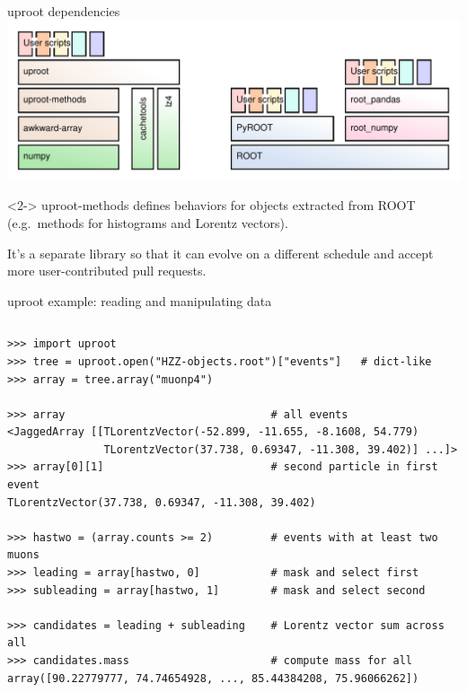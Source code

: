 \documentclass[aspectratio=169]{beamer}
\begin{document}
\begin{frame}{uproot dependencies}
\vspace{0.5 cm}
\includegraphics[width=\linewidth]{abstraction-layers.pdf}

\begin{uncoverenv}<2->
\vspace{0.1 cm}
uproot-methods defines behaviors for objects extracted from ROOT (e.g.\ methods for histograms and Lorentz vectors).

\vspace{0.2 cm}
It's a separate library so that it can evolve on a different schedule and accept more user-contributed pull requests.
\end{uncoverenv}
\end{frame}

\begin{frame}[fragile]{uproot example: reading and manipulating data}
\small
\vspace{0.1 cm}
\begin{columns}
\begin{verbatim}
>>> import uproot
>>> tree = uproot.open("HZZ-objects.root")["events"]   # dict-like
>>> array = tree.array("muonp4")

>>> array                                # all events
<JaggedArray [[TLorentzVector(-52.899, -11.655, -8.1608, 54.779)
               TLorentzVector(37.738, 0.69347, -11.308, 39.402)] ...]>
>>> array[0][1]                          # second particle in first event
TLorentzVector(37.738, 0.69347, -11.308, 39.402)

>>> hastwo = (array.counts >= 2)         # events with at least two muons
>>> leading = array[hastwo, 0]           # mask and select first
>>> subleading = array[hastwo, 1]        # mask and select second

>>> candidates = leading + subleading    # Lorentz vector sum across all
>>> candidates.mass                      # compute mass for all
array([90.22779777, 74.74654928, ..., 85.44384208, 75.96066262])
\end{verbatim}
\end{columns}
\end{frame}
\end{document}

